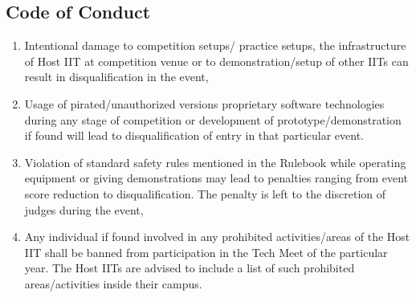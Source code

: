\subsection{Code of Conduct}
\begin{enumerate}
    \item Intentional damage to competition setups/ practice setups, the infrastructure of Host IIT at competition venue or to demonstration/setup of other IITs can result in disqualification in the event,
    \item Usage of pirated/unauthorized versions proprietary software technologies during any stage of competition or development of prototype/demonstration if found will lead to disqualification of entry in that particular event.
    \item Violation of standard safety rules mentioned in the Rulebook while operating equipment or giving demonstrations may lead to penalties ranging from event score reduction to disqualification. The penalty is left to the discretion of judges during the event,
    \item Any individual if found involved in any prohibited activities/areas of the Host IIT shall be banned from participation in the Tech Meet of the particular year. The Host IITs are advised to include a list of such prohibited areas/activities inside their campus.
\end{enumerate}
